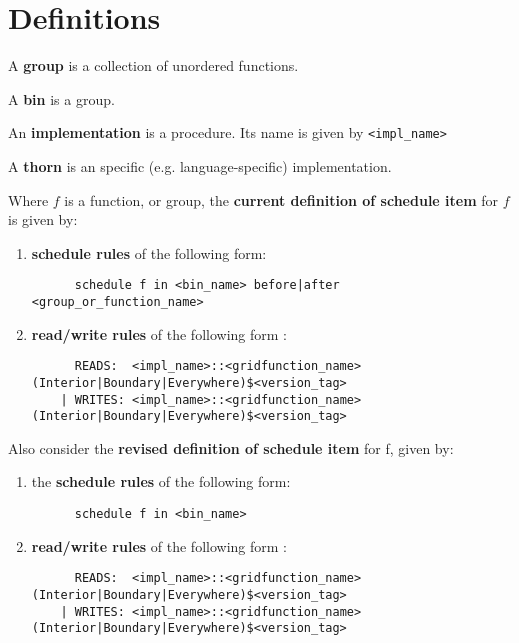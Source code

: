 
\section{Definitions}

A \textbf{group} is a collection of unordered functions.

A \textbf{bin} is a group.

An \textbf{implementation} is a procedure. Its name is given by \texttt{<impl\_name>}

A \textbf{thorn} is an specific (e.g. language-specific) implementation.

\begin{framed}
Where $f$ is a function, or group, the \textbf{current definition of schedule
item} for $f$ is given by:

  \begin{enumerate}[(1)]

  \item \textbf{schedule rules} of the following form: 

      \footnotesize
      \begin{verbatim}
      schedule f in <bin_name> before|after <group_or_function_name>
      \end{verbatim}
      \normalsize

  \item \textbf{read/write rules} of the following form :

      \footnotesize
      \begin{verbatim}
      READS:  <impl_name>::<gridfunction_name>(Interior|Boundary|Everywhere)$<version_tag>
    | WRITES: <impl_name>::<gridfunction_name>(Interior|Boundary|Everywhere)$<version_tag>
      \end{verbatim}
      \normalsize

  \end{enumerate}
\end{framed}

\begin{framed}
Also consider the \textbf{revised definition of schedule item} for f, given by:

  \begin{enumerate}[(1)]

  \item the \textbf{schedule rules} of the following form:

      \footnotesize
      \begin{verbatim}
      schedule f in <bin_name>
      \end{verbatim}
      \normalsize

  \item \textbf{read/write rules} of the following form :

      \footnotesize
      \begin{verbatim}
      READS:  <impl_name>::<gridfunction_name>(Interior|Boundary|Everywhere)$<version_tag>
    | WRITES: <impl_name>::<gridfunction_name>(Interior|Boundary|Everywhere)$<version_tag>
      \end{verbatim}
      \normalsize

  \end{enumerate}
\end{framed}

